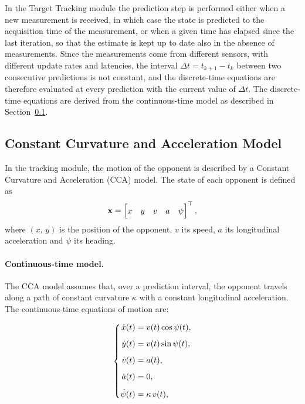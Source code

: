 In the Target Tracking module the prediction step is performed either when a new
measurement is received, in which case the state is predicted to the acquisition time of
the measurement, or when a given time has elapsed since the last iteration, so that the
estimate is kept up to date also in the absence of measurements. Since the measurements
come from different sensors, with different update rates and latencies, the interval
$\Delta t = t_{k+1} - t_k$ between two consecutive predictions is not constant, and the
discrete-time equations are therefore evaluated at every prediction with the current value of
$\Delta t$. The discrete-time equations are derived from the continuous-time model as described
in Section~\ref{subsec:tt_cca}.

\subsection{Constant Curvature and Acceleration Model}
\label{subsec:tt_cca}

In the tracking module, the motion of the opponent is described by a Constant Curvature and Acceleration (CCA)
model. The state of each opponent is defined as
\begin{equation}
    \renewcommand{\arraystretch}{1.3}\setlength{\jot}{8pt}
    \mathbf{x} = \begin{bmatrix} x & y & v & a & \psi \end{bmatrix}^\top,
    \label{eq:tt_state}
\end{equation}
where $(x,\,y)$ is the position of the opponent, $v$ its speed, $a$ its longitudinal
acceleration and $\psi$ its heading.

\paragraph{Continuous-time model.} The CCA model assumes that, over a prediction
interval, the opponent travels along a path of constant curvature $\kappa$ with a constant
longitudinal acceleration. The continuous-time equations of motion are:

\begin{equation}
    \renewcommand{\arraystretch}{1.3}\setlength{\jot}{8pt}
    \left\{
    \begin{aligned}
        \dot x(t)    &= v(t)\cos\psi(t), \\
        \dot y(t)    &= v(t)\sin\psi(t), \\
        \dot v(t)    &= a(t), \\
        \dot a(t)    &= 0, \\
        \dot\psi(t)  &= \kappa\,v(t),
    \end{aligned}
    \right.
    \label{eq:tt_cca}
\end{equation}

